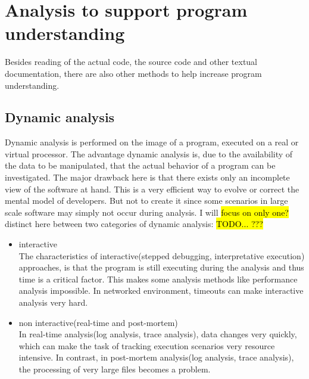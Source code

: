 \section{Analysis to support program understanding}

Besides reading of the actual code, the source code and other textual documentation, there are also other methods to help increase program understanding.

\subsection{Dynamic analysis}

Dynamic analysis is performed on the image of a program, executed on a real or virtual processor. The advantage dynamic analysis is, due to the availability of the data to be manipulated, that the actual behavior of a program can be investigated. The major drawback here is that there exists only an incomplete view of the software at hand\cite{Ball:1999:CDA:318774.318944}. This is a very efficient way to evolve or correct the mental model of developers. But not to create it since some scenarios in large scale software may simply not occur during analysis.
I will \hl{focus on only one?} distinct here between two categories of dynamic analysis:
\hl{TODO... ???}
\begin{itemize}
\item interactive\\
	The characteristics of interactive(stepped debugging, interpretative execution) approaches, is that the program is still executing during the analysis and thus time is a critical factor. This makes some analysis methods like performance analysis impossible. In networked environment, timeouts can make interactive analysis very hard.
\item non interactive(real-time and post-mortem)\\
	In real-time analysis(log analysis, trace analysis), data changes very quickly, which can make the task of tracking execution scenarios very resource intensive. In contrast, in post-mortem analysis(log analysis, trace analysis), the processing of very large files becomes a problem.
\end{itemize}



